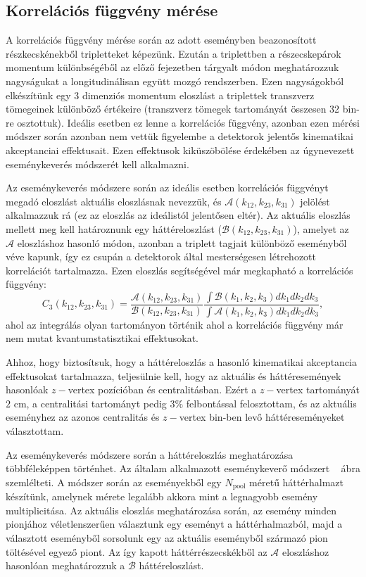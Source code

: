 \documentclass[11pt,a4paper]{article}
\numberwithin{equation}{subsection}
\numberwithin{figure}{section}
\begin{document}
\subsection{Korrelációs függvény mérése}

A korrelációs függvény mérése során az adott eseményben beazonosított részkecskénekből tripletteket képezünk. Ezután a triplettben a részecskepárok momentum különbségéből az előző fejezetben tárgyalt módon meghatározzuk nagyságukat a longitudinálisan együtt mozgó rendszerben. Ezen nagyságokból elkészítünk egy 3 dimenziós momentum eloszlást a triplettek transzverz tömegeinek különböző értékeire (transzverz tömegek tartományát összesen 32 bin-re osztottuk). Ideális esetben ez lenne a korrelációs függvény, azonban ezen mérési módszer során azonban nem vettük figyelembe a detektorok jelentős kinematikai akceptanciai effektusait. Ezen effektusok kiküszöbölése érdekében az úgynevezett eseménykeverés módszerét kell alkalmazni.

Az eseménykeverés módszere során az ideális esetben korrelációs függvényt megadó eloszlást aktuális eloszlásnak nevezzük, és $\mathcal{A}(k_{12},k_{23},k_{31})$ jelölést alkalmazzuk rá (ez az eloszlás az ideálistól jelentősen eltér). Az aktuális eloszlás mellett meg kell határoznunk egy háttéreloszlást ($\mathcal{B}(k_{12},k_{23},k_{31})$), amelyet az $\mathcal{A}$ eloszláshoz hasonló módon, azonban a triplett tagjait különböző eseményből véve kapunk, így ez csupán a detektorok által mesterségesen létrehozott korrelációt tartalmazza. Ezen eloszlás segítségével már megkapható a korrelációs függvény:
\begin{equation}
C_3(k_{12},k_{23},k_{31}) = \frac{\mathcal{A}(k_{12},k_{23},k_{31})}{\mathcal{B}(k_{12},k_{23},k_{31})}\frac{\int \mathcal{B}(k_1, k_2, k_3) dk_1dk_2dk_3}{\int \mathcal{A}(k_1,k_2,k_3)dk_1dk_2dk_3},
\end{equation}
ahol az integrálás olyan tartományon történik ahol a korrelációs függvény már nem mutat kvantumstatisztikai effektusokat.

Ahhoz, hogy biztosítsuk, hogy a háttéreloszlás a hasonló kinematikai akceptancia effektusokat tartalmazza, teljesülnie kell, hogy az aktuális és háttéresemények hasonlóak $z-$vertex pozícióban és centralitásban. Ezért a $z-$vertex tartományát $2$ cm, a centralitási tartományt pedig $3\%$ felbontással felosztottam, és az aktuális eseményhez az azonos centralitás és $z-$vertex bin-ben levő háttéreseményeket választottam.

Az eseménykeverés módszere során a háttéreloszlás meghatározása többféleképpen történhet. Az általam alkalmazott eseménykeverő módszert ~ ábra szemlélteti. A módszer során az eseményekből egy $N_\mathrm{pool}$ méretű háttérhalmazt készítünk, amelynek mérete legalább akkora mint a legnagyobb esemény multiplicitása. Az aktuális eloszlás meghatározása során, az esemény minden pionjához véletlenszerűen választunk egy eseményt a háttérhalmazból, majd a választott eseményből sorsolunk egy az aktuális eseményből származó pion töltésével egyező piont. Az így kapott háttérrészecskékből az $\mathcal{A}$ eloszláshoz hasonlóan meghatározzuk a $\mathcal{B}$ háttéreloszlást. 
\end{document}
